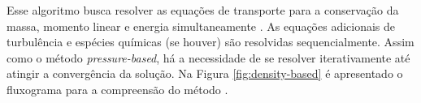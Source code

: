 Esse algoritmo busca resolver as equações de transporte para a conservação da massa, momento linear e energia simultaneamente \cite{Weiss1995PreconditioningAT, Weiss1997IMPLICITSO, Weiss1999ImplicitSO}. As equações adicionais de turbulência e espécies químicas (se houver) são resolvidas sequencialmente. Assim como o método \textit{pressure-based}, há a necessidade de se resolver iterativamente até atingir a convergência da solução. Na Figura \ref{fig:density-based} é apresentado o fluxograma para a compreensão do método \cite{fluent2021ansys}.

\begin{figure}[!ht]
    \centering


\begin{tikzpicture}[x=0.75pt,y=0.75pt,yscale=-1,xscale=1]


\end{tikzpicture}
\end{figure}
